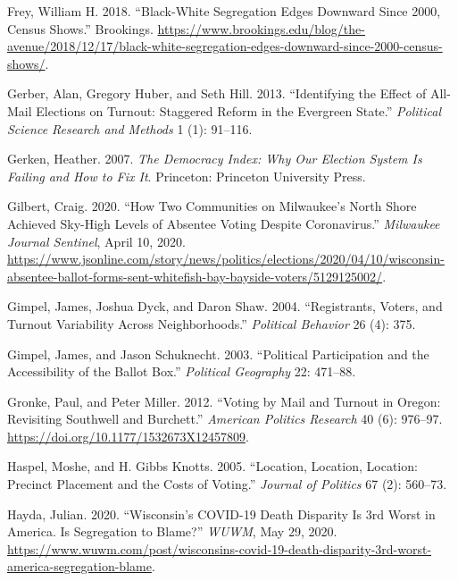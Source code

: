 \documentclass[
  12pt,
]{article}
\newlength{\cslhangindent}
\newenvironment{cslreferences}%
  {\setlength{\parindent}{0pt}%
  \everypar{\setlength{\hangindent}{\cslhangindent}}\ignorespaces}%
  {\par}
\begin{document}
\begin{cslreferences}
\leavevmode\hypertarget{ref-Frey2018}{}%
Frey, William H. 2018. ``Black-White Segregation Edges Downward Since 2000, Census Shows.'' Brookings. \url{https://www.brookings.edu/blog/the-avenue/2018/12/17/black-white-segregation-edges-downward-since-2000-census-shows/}.

\leavevmode\hypertarget{ref-Gerber2013}{}%
Gerber, Alan, Gregory Huber, and Seth Hill. 2013. ``Identifying the Effect of All-Mail Elections on Turnout: Staggered Reform in the Evergreen State.'' \emph{Political Science Research and Methods} 1 (1): 91--116.

\leavevmode\hypertarget{ref-Gerken2007}{}%
Gerken, Heather. 2007. \emph{The Democracy Index: Why Our Election System Is Failing and How to Fix It}. Princeton: Princeton University Press.

\leavevmode\hypertarget{ref-Gilbert2020}{}%
Gilbert, Craig. 2020. ``How Two Communities on Milwaukee's North Shore Achieved Sky-High Levels of Absentee Voting Despite Coronavirus.'' \emph{Milwaukee Journal Sentinel}, April 10, 2020. \url{https://www.jsonline.com/story/news/politics/elections/2020/04/10/wisconsin-absentee-ballot-forms-sent-whitefish-bay-bayside-voters/5129125002/}.

\leavevmode\hypertarget{ref-Gimpel2004}{}%
Gimpel, James, Joshua Dyck, and Daron Shaw. 2004. ``Registrants, Voters, and Turnout Variability Across Neighborhoods.'' \emph{Political Behavior} 26 (4): 375.

\leavevmode\hypertarget{ref-Gimpel2003}{}%
Gimpel, James, and Jason Schuknecht. 2003. ``Political Participation and the Accessibility of the Ballot Box.'' \emph{Political Geography} 22: 471--88.

\leavevmode\hypertarget{ref-Gronke2012}{}%
Gronke, Paul, and Peter Miller. 2012. ``Voting by Mail and Turnout in Oregon: Revisiting Southwell and Burchett.'' \emph{American Politics Research} 40 (6): 976--97. \url{https://doi.org/10.1177/1532673X12457809}.

\leavevmode\hypertarget{ref-Haspel2005}{}%
Haspel, Moshe, and H. Gibbs Knotts. 2005. ``Location, Location, Location: Precinct Placement and the Costs of Voting.'' \emph{Journal of Politics} 67 (2): 560--73.

\leavevmode\hypertarget{ref-Hayda2020}{}%
Hayda, Julian. 2020. ``Wisconsin's COVID-19 Death Disparity Is 3rd Worst in America. Is Segregation to Blame?'' \emph{WUWM}, May 29, 2020. \url{https://www.wuwm.com/post/wisconsins-covid-19-death-disparity-3rd-worst-america-segregation-blame}.


\end{cslreferences}
\end{document}
